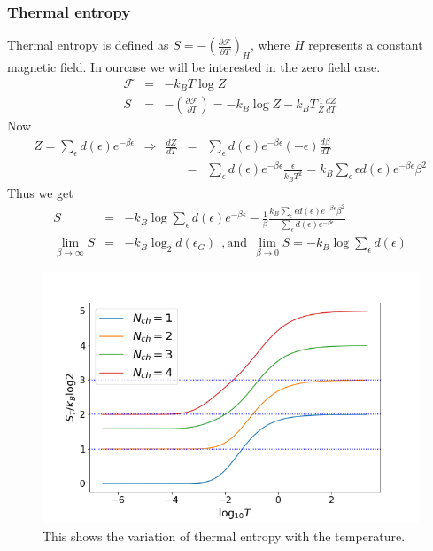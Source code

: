 \documentclass[reprint,prb,superscriptaddress]{revtex4-1}
\begin{document}
\subsubsection{Thermal entropy}
Thermal entropy is defined as $S=-(\frac{\partial \mathcal{F}}{\partial T})_H$, where $H$ represents a constant magnetic field. In ourcase we will be interested in the zero field case. 
\begin{eqnarray}
\mathcal{F}&=& -k_B T\log Z \nonumber\\
S &=& -(\frac{\partial \mathcal{F}}{\partial T}) = -k_B \log Z -k_B T \frac{1}{Z} \frac{dZ}{dT}
\end{eqnarray}
Now 
\begin{eqnarray}
Z =\sum_\epsilon  d(\epsilon)e^{-\beta \epsilon} ~~\Rightarrow ~~  \frac{dZ}{dT} &=& \sum_\epsilon d(\epsilon) e^{-\beta \epsilon}  (-\epsilon) \frac{d\beta}{dT} \nonumber\\
&=& \sum_\epsilon d(\epsilon) e^{-\beta \epsilon}   \frac{ \epsilon}{k_B T^2} =k_B\sum_\epsilon \epsilon d(\epsilon) e^{-\beta \epsilon} \beta^2   
\end{eqnarray}
Thus we get
\begin{eqnarray}
S &=& -k_B \log \sum_{\epsilon} d(\epsilon) e^{-\beta \epsilon}  -\frac{1}{\beta} \frac{k_B\sum_\epsilon \epsilon d(\epsilon) e^{-\beta \epsilon} \beta^2   }{\sum_\epsilon  d(\epsilon)e^{-\beta \epsilon}} \nonumber\\
\lim_{\beta\rightarrow \infty} S &=& -k_B \log_2 d(\epsilon_{G})  ~~, \textrm{and}~~ \lim_{\beta\rightarrow 0} S = -k_B \log \sum_\epsilon d(\epsilon) 
\end{eqnarray}
\begin{figure}
\centering
\includegraphics[scale=0.36]{plt/ThermalEntanglementVS_LogTemperature_}
\caption{This shows the variation of thermal entropy with the temperature.}
\label{fig:thermal_entropy}
\end{figure}
\end{document}

